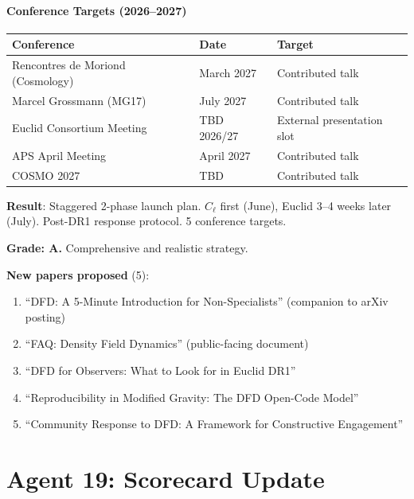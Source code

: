\documentclass[11pt,a4paper]{article}
\begin{document}
\subsection{Conference Targets (2026--2027)}

\begin{center}
\begin{tabular}{lll}
\toprule
\textbf{Conference} & \textbf{Date} & \textbf{Target} \\
\midrule
Rencontres de Moriond (Cosmology) & March 2027 & Contributed talk \\
Marcel Grossmann (MG17) & July 2027 & Contributed talk \\
Euclid Consortium Meeting & TBD 2026/27 & External presentation slot \\
APS April Meeting & April 2027 & Contributed talk \\
COSMO 2027 & TBD & Contributed talk \\
\bottomrule
\end{tabular}
\end{center}

\begin{tcolorbox}[colback=blue!5!white, colframe=blue!60!black, title={Agent 18: Community Strategy COMPLETE}]
\textbf{Result}: Staggered 2-phase launch plan. $C_\ell$ first (June), Euclid 3--4 weeks later (July). Post-DR1 response protocol. 5 conference targets.

\textbf{Grade: A.} Comprehensive and realistic strategy.

\textbf{New papers proposed} (5):
\begin{enumerate}
\item ``DFD: A 5-Minute Introduction for Non-Specialists'' (companion to arXiv posting)
\item ``FAQ: Density Field Dynamics'' (public-facing document)
\item ``DFD for Observers: What to Look for in Euclid DR1''
\item ``Reproducibility in Modified Gravity: The DFD Open-Code Model''
\item ``Community Response to DFD: A Framework for Constructive Engagement''
\end{enumerate}
\end{tcolorbox}


\part{Agent 19: Scorecard Update}
\label{part:scorecard}
\end{document}
